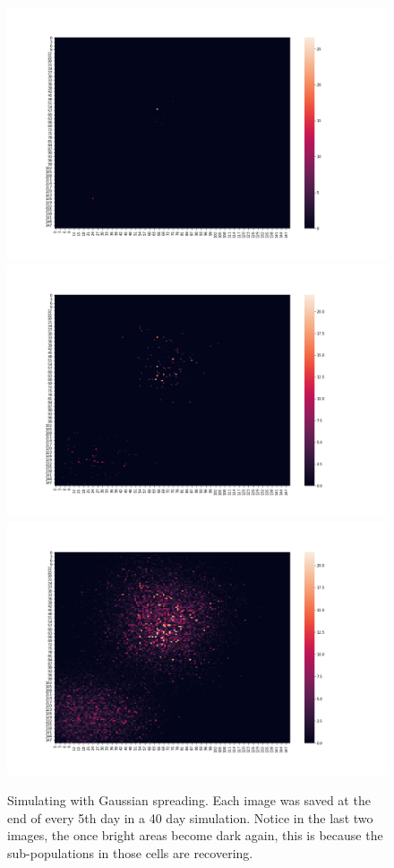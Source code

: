 \documentclass[a4paper]{article}
\begin{document}
\begin{figure}[ht]
  \caption{Simulating with Gaussian spreading. Each image was saved at the end
  of every 5th day in a 40 day simulation. Notice in the last two images, the
once bright areas become dark again, this is because the sub-populations in those 
cells are recovering.}
  \includegraphics[scale=0.14]{../gaussian_spread/gaussian_spread_0.png}
  \centering
  \includegraphics[scale=0.14]{../gaussian_spread/gaussian_spread_1.png}
  \centering
  \includegraphics[scale=0.14]{../gaussian_spread/gaussian_spread_2.png}

\end{figure}
\end{document}
